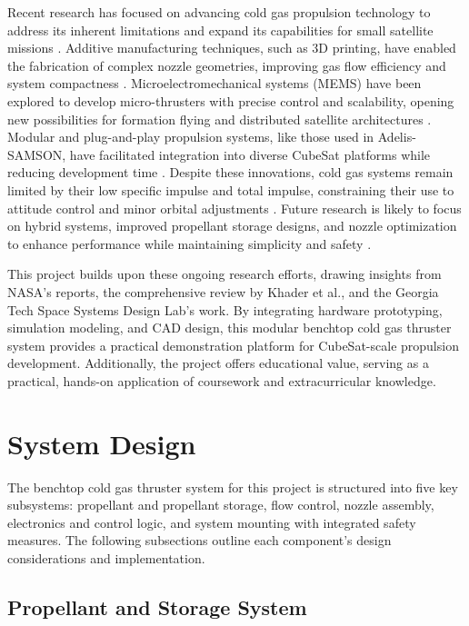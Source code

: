 \documentclass{new-aiaa}
\begin{document}
Recent research has focused on advancing cold gas propulsion technology to address its inherent limitations and expand its capabilities for small satellite missions \cite{nasa2021,khader2018space,skidmore2016,adelis2019}. Additive manufacturing techniques, such as 3D printing, have enabled the fabrication of complex nozzle geometries, improving gas flow efficiency and system compactness \cite{skidmore2016}. Microelectromechanical systems (MEMS) have been explored to develop micro-thrusters with precise control and scalability, opening new possibilities for formation flying and distributed satellite architectures \cite{khader2018space}. Modular and plug-and-play propulsion systems, like those used in Adelis-SAMSON, have facilitated integration into diverse CubeSat platforms while reducing development time \cite{adelis2019}. Despite these innovations, cold gas systems remain limited by their low specific impulse and total impulse, constraining their use to attitude control and minor orbital adjustments \cite{nasa2021,khader2018space}. Future research is likely to focus on hybrid systems, improved propellant storage designs, and nozzle optimization to enhance performance while maintaining simplicity and safety \cite{nasa2021,khader2018space}.

This project builds upon these ongoing research efforts, drawing insights from NASA’s reports, the comprehensive review by Khader et al., and the Georgia Tech Space Systems Design Lab’s work. By integrating hardware prototyping, simulation modeling, and CAD design, this modular benchtop cold gas thruster system provides a practical demonstration platform for CubeSat-scale propulsion development. Additionally, the project offers educational value, serving as a practical, hands-on application of coursework and extracurricular knowledge.


\section{System Design}

The benchtop cold gas thruster system for this project is structured into five key subsystems: propellant and propellant storage, flow control, nozzle assembly, electronics and control logic, and system mounting with integrated safety measures. The following subsections outline each component's design considerations and implementation.

\subsection{Propellant and Storage System}
\end{document}
